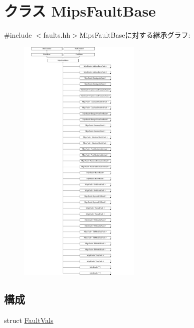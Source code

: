 \hypertarget{classMipsISA_1_1MipsFaultBase}{
\section{クラス MipsFaultBase}
\label{classMipsISA_1_1MipsFaultBase}
}


{\ttfamily \#include $<$faults.hh$>$}MipsFaultBaseに対する継承グラフ:\begin{figure}[H]
\begin{center}
\leavevmode
\includegraphics[height=12cm]{classMipsISA_1_1MipsFaultBase}
\end{center}
\end{figure}
\subsection*{構成}
\begin{DoxyCompactItemize}
\item 
struct \hyperlink{structMipsISA_1_1MipsFaultBase_1_1FaultVals}{FaultVals}
\end{DoxyCompactItemize}
